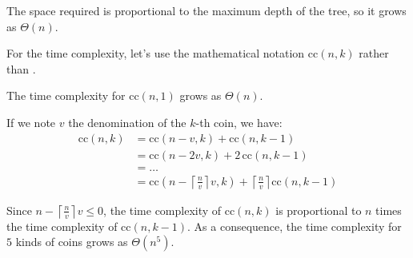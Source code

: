 \begin{exe} %
    The space required is proportional to the maximum depth of the tree, so it 
    grows as $\Theta(n)$.

    For the time complexity, let’s use the mathematical notation $\text{cc}(n, 
    k)$ rather than .

    The time complexity for $\text{cc}(n, 1)$ grows as $\Theta(n)$.

    If we note $v$ the denomination of the $k$-th coin, we have:
    \begin{align*}
        \text{cc}(n, k) &= \text{cc}(n - v, k) + \text{cc}(n, k - 1) \\
                        &= \text{cc}(n - 2v, k) + 2\, \text{cc}(n, k - 1) \\
                        &= … \\
                        &= \text{cc}(n - \left\lceil \frac{n}{v} \right\rceil v, 
                        k) + \left\lceil \frac{n}{v} \right\rceil \text{cc}(n, 
                        k - 1)
    \end{align*}

    Since $n - \left\lceil \frac{n}{v} \right\rceil v \leq 0$, the time 
    complexity of $\text{cc}(n, k)$ is proportional to $n$ times the time 
    complexity of $\text{cc}(n, k - 1)$. As a consequence, the time complexity 
    for $5$ kinds of coins grows as $\Theta(n^5)$.
\end{exe}

